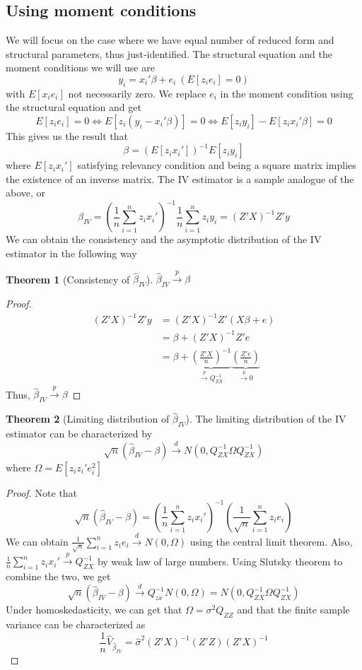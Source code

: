\documentclass[12pt]{article}
\theoremstyle{definition}
\theoremstyle{property}
\theoremstyle{assumption}
\theoremstyle{example}
\theoremstyle{comment}
\newtheorem{theorem}{Theorem}[section]
\begin{document}
\subsection{Using moment conditions}
We will focus on the case where we have equal number of reduced form and structural parameters, thus just-identified. The structural equation and the moment conditions we will use are
\[
y_i = x_i'\beta+e_i \ (E[z_ie_i]=0)
\]
with $E[x_ie_i]$ not necessarily zero. We replace $e_i$ in the moment condition using the structural equation and get
\[
E[z_ie_i]=0 \iff E[z_i(y_i-x_i'\beta)]=0 \iff E[z_iy_i]-E[z_ix_i'\beta]=0
\]
This gives us the result that
\[
\beta=\left(E[z_ix_i']\right)^{-1}E[z_iy_i]
\]
where $E[z_ix_i']$ satisfying relevancy condition and being a square matrix implies the existence of an inverse matrix. The IV estimator is a sample analogue of the above, or
\[
\hat{\beta}_{IV}=\left(\frac{1}{n}\sum_{i=1}^nz_ix_i'\right)^{-1}\frac{1}{n}\sum_{i=1}^nz_iy_i = (Z'X)^{-1}Z'y
\] 
We can obtain the consistency and the asymptotic distribution of the IV estimator in the following way
\begin{mdframed}[backgroundcolor=green!5] 
\begin{theorem}[Consistency of $\hat{\beta}_{IV}$]
$\hat{\beta}_{IV}\xrightarrow{p}\beta$
\begin{proof}
\[
\begin{aligned}
(Z'X)^{-1}Z'y&=(Z'X)^{-1}Z'(X\beta+e)\\
&=\beta+(Z'X)^{-1}Z'e\\
&=\beta+\underbrace{\left(\frac{Z'X}{n}\right)^{-1}}_{\xrightarrow{p}Q_{ZX}^{-1}}\underbrace{\left(\frac{Z'e}{n}\right)}_{\xrightarrow{p}0}
\end{aligned}
\]
Thus, $\hat{\beta}_{IV}\xrightarrow{p}\beta$
\end{proof}
\end{theorem}
\begin{theorem}[Limiting distribution of $\hat{\beta}_{IV}$]
The limiting distribution of the IV estimator can be characterized by
\[
\sqrt{n}(\hat{\beta}_{IV}-\beta)\xrightarrow{d}N(0,Q_{ZX}^{-1}\Omega Q_{ZX}^{-1}) 
\]
where $\Omega=E[z_iz_i'e_i^2]$ 

\begin{proof}
Note that 
\[
\sqrt{n}(\hat{\beta}_{IV}-\beta) = \left(\frac{1}{n} \sum_{i=1}^n z_ix_i'\right)^{-1}\left(\frac{1}{\sqrt{n}}\sum_{i=1}^nz_ie_i\right)
\]
We can obtain $\frac{1}{\sqrt{n}}\sum_{i=1}^nz_ie_i\xrightarrow{d}N(0,\Omega)$ using the central limit theorem. Also, $\frac{1}{n} \sum_{i=1}^n z_ix_i'\xrightarrow{p}Q_{ZX}^{-1}$ by weak law of large numbers. Using Slutsky theorem to combine the two, we get
\[
\sqrt{n}(\hat{\beta}_{IV}-\beta) \xrightarrow{d}Q_{zx}^{-1}N(0,\Omega)=N(0,Q_{ZX}^{-1}\Omega Q_{ZX}^{-1}) 
\]
Under homoskedasticity, we can get that $\Omega= \sigma^2Q_{ZZ}$ and that the finite sample variance can be characterized as 
\[
\frac{1}{n}\widehat{V}_{\hat{\beta}_{IV}}=\hat{\sigma}^2(Z'X)^{-1}(Z'Z)(Z'X)^{-1}
\]
\end{proof}
\end{theorem}
\end{mdframed} \par

\end{document}
